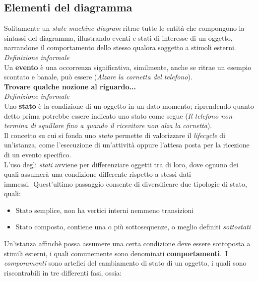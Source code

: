 \documentclass{article}
\begin{document}
\subsection*{Elementi del diagramma}
\large
Solitamente un \textit{state machine diagram} ritrae tutte le entità che compongono la sintassi del diagramma, illustrando eventi e stati di interesse di un oggetto, narrandone il comportamento dello stesso qualora soggetto a stimoli esterni.\vspace*{14pt}\\
\textit{Definizione informale}\\Un \textbf{evento} è una occorrenza significativa, similmente, anche se ritrae un esempio scontato e banale, può essere (\textit{Alzare la cornetta del telefono}).\vspace*{14pt}\\
\textbf{Trovare qualche nozione al riguardo...}\vspace*{14pt}\\
\textit{Definizione informale}\\Uno \textbf{stato} è la condizione di un oggetto in un dato momento; riprendendo quanto detto prima potrebbe essere indicato uno stato come segue (\textit{Il telefono non termina di squillare fino a quando il ricevitore non alza la cornetta}).\vspace*{14pt}\\
Il concetto su cui si fonda uno \textit{stato} permette di valorizzare il \textit{lifecycle} di un'istanza, come l'esecuzione di un'attività oppure l'attesa posta per la ricezione di un evento specifico.\\
L'uso degli \textit{stati} avviene per differenziare oggetti tra di loro, dove ognuno dei quali assumerà una condizione differente rispetto a stessi dati immessi.\ Quest'ultimo passaggio consente di diversificare due tipologie di stato, quali:
\begin{itemize}[label={-}]
    \itemsep0em
    \item Stato semplice, non ha vertici interni nemmeno transizioni
    \item Stato composto, contiene una o più sottosequenze, o meglio definiti \textit{sottostati}
\end{itemize}
Un'istanza affinchè possa assumere una certa condizione deve essere sottoposta a stimili esterni, i quali comunemente sono denominati \textbf{comportamenti}.\ I \textit{comporamenti} sono artefici del cambiamento di stato di un oggetto, i quali sono riscontrabili in tre differenti fasi, ossia:
\end{document}
